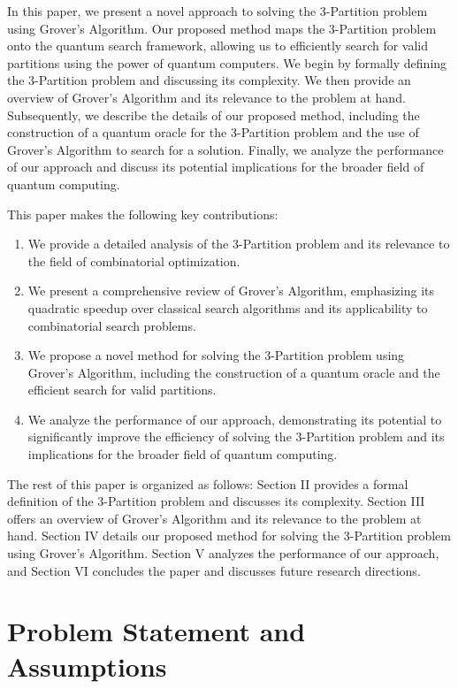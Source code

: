 In this paper, we present a novel approach to solving the 3-Partition problem using Grover's Algorithm. Our proposed method maps the 3-Partition problem onto the quantum search framework, allowing us to efficiently search for valid partitions using the power of quantum computers. We begin by formally defining the 3-Partition problem and discussing its complexity. We then provide an overview of Grover's Algorithm and its relevance to the problem at hand. Subsequently, we describe the details of our proposed method, including the construction of a quantum oracle for the 3-Partition problem and the use of Grover's Algorithm to search for a solution. Finally, we analyze the performance of our approach and discuss its potential implications for the broader field of quantum computing.

This paper makes the following key contributions:

\begin{enumerate}
  \item We provide a detailed analysis of the 3-Partition problem and its relevance to the field of combinatorial optimization.
  \item We present a comprehensive review of Grover's Algorithm, emphasizing its quadratic speedup over classical search algorithms and its applicability to combinatorial search problems.
  \item We propose a novel method for solving the 3-Partition problem using Grover's Algorithm, including the construction of a quantum oracle and the efficient search for valid partitions.
  \item We analyze the performance of our approach, demonstrating its potential to significantly improve the efficiency of solving the 3-Partition problem and its implications for the broader field of quantum computing.
\end{enumerate}

The rest of this paper is organized as follows: Section II provides a formal definition of the 3-Partition problem and discusses its complexity. Section III offers an overview of Grover's Algorithm and its relevance to the problem at hand. Section IV details our proposed method for solving the 3-Partition problem using Grover's Algorithm. Section V analyzes the performance of our approach, and Section VI concludes the paper and discusses future research directions.



\section{Problem Statement and Assumptions}


